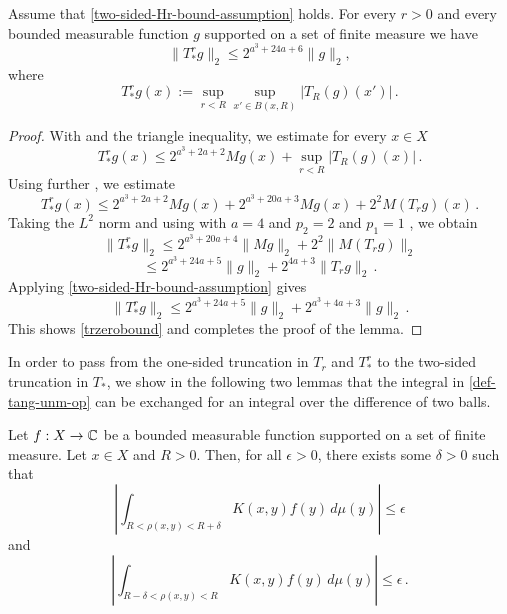 \begin{lemma}\label{simple-nontangential-operator}
Assume that \eqref{two-sided-Hr-bound-assumption} holds.
For every  $r>0$ and every bounded measurable function $g$ supported on a set of finite measure we have
\begin{equation}\label{trzerobound}
    \|T_{*}^rg\|_2\le 2^{a^3+24a+6}\|g\|_2,
\end{equation}
where
\begin{equation}\label{eq-simple--nontangential}
    T_{*}^r g(x):=\sup_{r<R}\sup_{x'\in B(x,R)} |T_R(g)(x')| \, .
\end{equation}
\end{lemma}
\begin{proof}
With  and the triangle inequality, we estimate for every $x\in X$
\begin{equation}
     T_{*}^r g(x)
     \le 2^{a^3 + 2a + 2} Mg(x)+\sup_{r<R} |T_R(g)(x)|\, .
\end{equation}
Using further , we estimate
\begin{equation}
      T_{*}^r g(x)
     \le 2^{a^3+2a+2}Mg(x) + 2^{a^3+20a+3}Mg(x) + 2^{2}M(T_rg)(x)\, .
\end{equation}
Taking the $L^2$ norm and using  with $a=4$  and $p_2=2$ and $p_1=1$ , we obtain
\begin{equation}
      \|T_{*}^r g\|_2
     \le 2^{a^3+20a+4} \|Mg\|_2 + 2^{2}\|M(T_rg)\|_2
\end{equation}
\begin{equation}
     \le 2^{a^3+24a+5} \|g\|_2 + 2^{4a+3}\|T_r g\|_2\, .
\end{equation}
Applying \eqref{two-sided-Hr-bound-assumption} gives
\begin{equation}
      \|T_{*}^r g\|_2\le 2^{a^3+24a+5}\|g\|_2 + 2^{a^3+4a+3}\|g\|_2\, .
\end{equation}
This shows \eqref{trzerobound} and completes the proof of the lemma.
\end{proof}
In order to pass from the one-sided truncation in $T_r$ and $T_{*}^r$ to the two-sided truncation in $T_*$, we show in the following two lemmas that the integral in \eqref{def-tang-unm-op} can be exchanged for an integral over the difference of two balls.
\begin{lemma} \label{small-annulus}
    Let $f:X\to{\mathbb{C}}$ be a bounded measurable function supported on a set of finite measure.
    Let $x\in X$ and $R>0$.
    Then, for all $\epsilon>0$, there exists some $\delta>0$ such that
    \begin{equation}
        \left| \int_{R<\rho(x,y)<R+\delta} K(x,y) f(y) \, d\mu(y) \right| \le \epsilon
    \end{equation}
    and
    \begin{equation}
        \left| \int_{R-\delta<\rho(x,y)<R} K(x,y) f(y) \, d\mu(y) \right| \le \epsilon \,.
    \end{equation}
\end{lemma}

